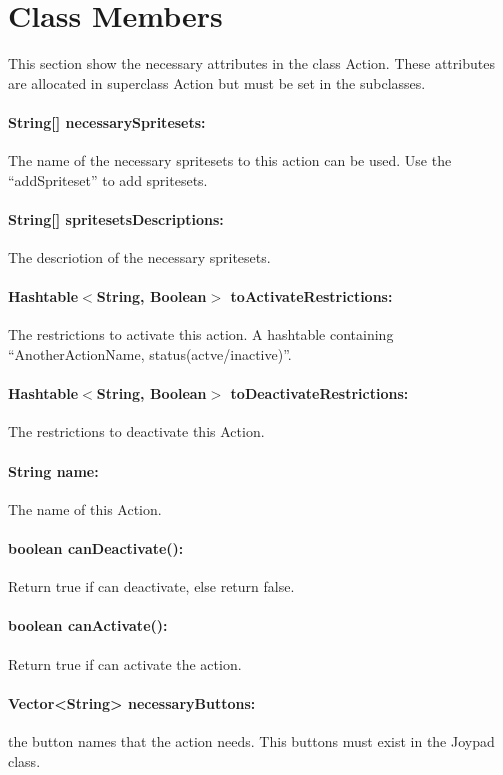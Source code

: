 		 
		 
	\section{Class Members}
	
	This section show the necessary attributes in the class Action. These attributes are allocated in superclass Action but must be set in the subclasses.
	
	\paragraph{String[] necessarySpritesets:} The name of the necessary spritesets to this action can be used. Use the ``addSpriteset'' to add spritesets.
	\paragraph{String[] spritesetsDescriptions:} The descriotion of the necessary spritesets.
	\paragraph{Hashtable$<$String, Boolean$>$ toActivateRestrictions: } The restrictions to activate this action. A hashtable containing ``AnotherActionName, status(actve/inactive)''.
	\paragraph{ Hashtable$<$String, Boolean$>$ toDeactivateRestrictions: } The restrictions to deactivate this Action.
	\paragraph{String name: } The name of this Action.
	\paragraph{boolean canDeactivate():} Return true if can deactivate, else return false. 
	\paragraph{boolean canActivate(): } Return true if can activate the action.
	\paragraph{Vector<String> necessaryButtons: } the button names that the action needs. This buttons must exist in the Joypad class.
